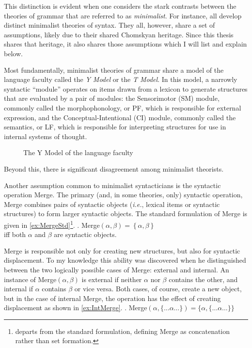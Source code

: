 \documentclass[MilwayThesis]{subfiles}
\begin{document}
This distinction is evident when one considers the stark contrasts between the theories of grammar that are referred to as \textit{minimalist}.
For instance, \textcite{chomsky2000minimalist,hornstein2009theory,frampton2008crash,epstein2006derivations,borer2005name,borer2005normal,borer2013taking} all develop distinct minimalist theories of syntax.
They all, however, share a set of assumptions, likely due to their shared Chomskyan heritage.
Since this thesis shares that heritage, it also shares those assumptions which I will list and explain below.

Most fundamentally, minimalist theories of grammar share a model of the language faculty called the \textit{Y Model} or the \textit{T Model}.
In this model, a narrowly syntactic ``module'' operates on items drawn from a lexicon to generate structures that are evaluated by a pair of modules:
the Sensorimotor (SM) module, commonly called the morphophonology, or PF, which is responsible for external expression, and the Conceptual-Intentional (CI) module, commonly called the semantics, or LF, which is responsible for interpreting structures for use in internal systems of thought.
\begin{figure}[h]
	\centering
	\caption{The Y Model of the language faculty}
	\label{fig:YModel}
\end{figure}
Beyond this, there is significant disagreement among minimalist theorists.

Another assumption common to minimalist syntacticians is the syntactic operation Merge.
The primary (and, in some theories, only) syntactic operation, Merge combines pairs of syntactic objects (\textit{i.e.}, lexical items or syntactic structures) to form larger syntactic objects.
The standard formulation of Merge is given in \cref{ex:MergeStd}\footnote{
	\textcite{hornstein2009theory} departs from the standard formulation, defining Merge as concatenation rather than set formation.
}.
\ex.\label{ex:MergeStd} Merge$(\alpha, \beta) = \left\{ \alpha, \beta \right\}$\\
iff both $\alpha$ and $\beta$ are syntactic objects.

Merge is responsible not only for creating new structures, but also for syntactic displacement.
To my knowledge this ability was discovered \textcite{chomsky2004beyond} when he distinguished between the two logically possible cases of Merge: external and internal.
An instance of Merge$(\alpha, \beta)$ is external if neither $\alpha$ nor $\beta$ contains the other, and internal if $\alpha$ contains $\beta$ or vice versa.
Both cases, of course, create a new object, but in the case of internal Merge, the operation has the effect of creating displacement as shown in \cref{ex:IntMerge}.
\ex.\label{ex:IntMerge} Merge$(\alpha, \{\ldots\alpha\ldots\}) = \{\alpha, \{\ldots\alpha\ldots\}\}$
\end{document}
